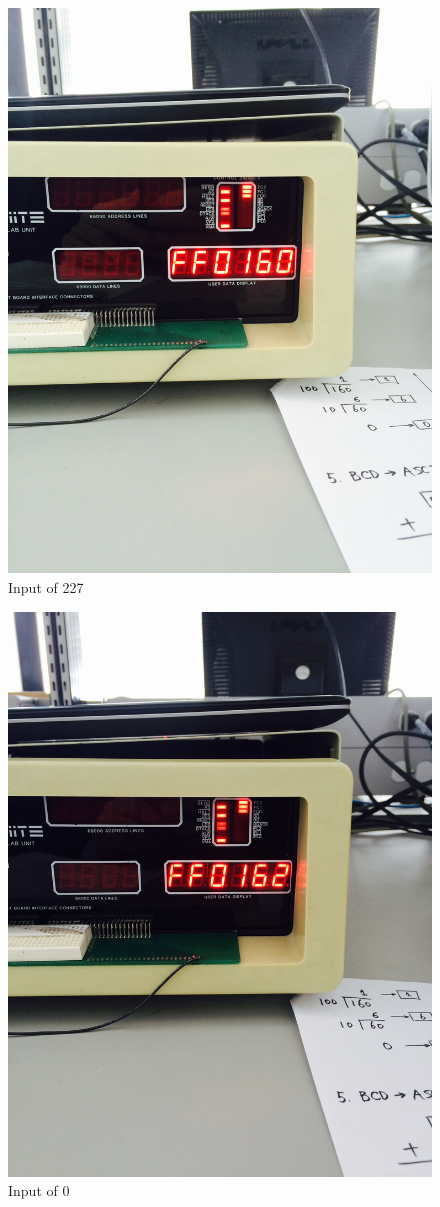 \documentclass[12pt, twocolumn]{article}
\begin{document}
\begin{figure}[H]
\centering
\includegraphics[width=0.8\linewidth]{FullSizeRender}
\caption{Input of 227}
\label{fig:FullSizeRender}
\end{figure}

\begin{figure}[H]
\centering
\includegraphics[width=0.8\linewidth]{FullSizeRender_1}
\caption{Input of 0}
\label{fig:FullSizeRender_1}
\end{figure}
\end{document}
